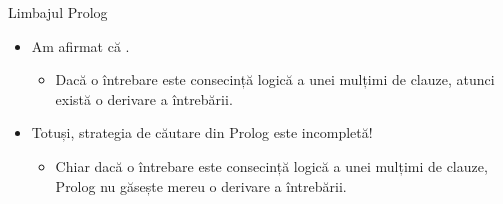 \documentclass[xcolor=pdftex,romanian,colorlinks]{beamer}
\begin{document}
%
%
%
%
%

\begin{frame}{Limbajul Prolog}
\begin{itemize}
  \item Am afirmat că . 
  \begin{itemize}
    \item Dacă o întrebare este consecință logică a unei mulțimi de clauze, atunci există o derivare a întrebării.
  \end{itemize}
  \medskip
  \item Totuși, \alert{strategia de căutare din Prolog este incompletă!}
  \begin{itemize}
    \item Chiar dacă o întrebare este consecință logică a unei mulțimi de clauze, Prolog nu găsește mereu o derivare a întrebării.
  \end{itemize}
  
\end{itemize}
\end{frame}
\end{document}
